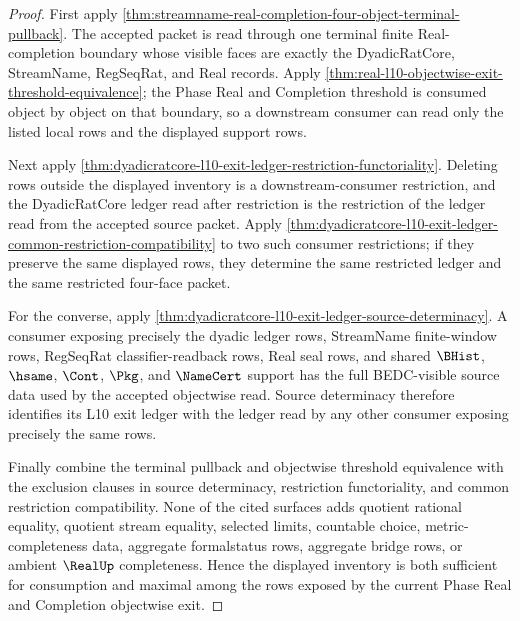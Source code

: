\begin{proof}
First apply \autoref{thm:streamname-real-completion-four-object-terminal-pullback}. The accepted packet is read through one terminal finite Real-completion boundary whose visible faces are exactly the DyadicRatCore, StreamName, RegSeqRat, and Real records. Apply \autoref{thm:real-l10-objectwise-exit-threshold-equivalence}; the Phase Real and Completion threshold is consumed object by object on that boundary, so a downstream consumer can read only the listed local rows and the displayed support rows.

Next apply \autoref{thm:dyadicratcore-l10-exit-ledger-restriction-functoriality}. Deleting rows outside the displayed inventory is a downstream-consumer restriction, and the DyadicRatCore ledger read after restriction is the restriction of the ledger read from the accepted source packet. Apply \autoref{thm:dyadicratcore-l10-exit-ledger-common-restriction-compatibility} to two such consumer restrictions; if they preserve the same displayed rows, they determine the same restricted ledger and the same restricted four-face packet.

For the converse, apply \autoref{thm:dyadicratcore-l10-exit-ledger-source-determinacy}. A consumer exposing precisely the dyadic ledger rows, StreamName finite-window rows, RegSeqRat classifier-readback rows, Real seal rows, and shared $\BHist$, $\hsame$, $\Cont$, $\Pkg$, and $\NameCert$ support has the full BEDC-visible source data used by the accepted objectwise read. Source determinacy therefore identifies its L10 exit ledger with the ledger read by any other consumer exposing precisely the same rows.

Finally combine the terminal pullback and objectwise threshold equivalence with the exclusion clauses in source determinacy, restriction functoriality, and common restriction compatibility. None of the cited surfaces adds quotient rational equality, quotient stream equality, selected limits, countable choice, metric-completeness data, aggregate formalstatus rows, aggregate bridge rows, or ambient $\RealUp$ completeness. Hence the displayed inventory is both sufficient for consumption and maximal among the rows exposed by the current Phase Real and Completion objectwise exit.
\end{proof}

